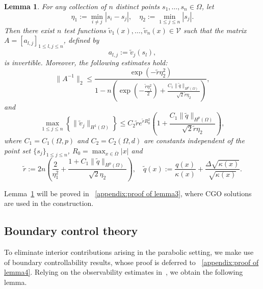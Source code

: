\documentclass[12pt]{amsart}
\newtheorem{lem}[thm]{Lemma}
\begin{document}
\begin{lem}\label{invertible matrix thm}
      For any collection of \( n \) distinct points \( s_1, \ldots, s_n \in \Omega \), let
\[
\eta_1 := \min_{i \neq j} |s_i - s_j|, \quad \eta_2 := \min_{1 \leq j \leq n} |s_j|.
\]
Then there exist \( n \) test functions \( \tilde{v}_1(x), \ldots, \tilde{v}_n(x) \in \mathcal{V} \) such that the matrix \( A = [a_{l,j}]_{1 \leq l,j \leq n} \), defined by
\begin{equation} \label{matrix A}
    a_{l,j} := \tilde{v}_j(s_l),
\end{equation}
is invertible. Moreover, the following estimates hold:
\begin{equation} \label{bound of A}
    \|A^{-1}\|_2 \leq \frac{\exp(-\tilde{r}\eta_2^2)}{1 - n\left( \exp\left(-\frac{\tilde{r} \eta_1^2}{2}\right) + \frac{C_1 \|\tilde{q}\|_{H^p(\Omega)}}{\sqrt{2} \tilde{r} \eta_2} \right)},
\end{equation}
and
\begin{equation} \label{bound of patial v}
    \max_{1 \leq j \leq n} \left\{ \|\tilde{v}_j\|_{H^1(\Omega)} \right\} \leq C_2 \tilde{r} e^{\tilde{r} R_0^2} \left( 1 + \frac{C_1 \|\tilde{q}\|_{H^p(\Omega)}}{\sqrt{2} \tilde{r} \eta_2} \right),
\end{equation}
where \( C_1 = C_1(\Omega, p) \) and \( C_2 = C_2(\Omega, d) \) are constants independent of the point set \( \{s_j\}_{1 \leq j \leq n} \), $R_0=\max_{x\in \overline{\Omega}}|x|$ and
\[
\tilde{r} := 2n \left( \frac{2}{\eta_1^2} + \frac{1 + C_1 \|\tilde{q}\|_{H^p(\Omega)}}{\sqrt{2} \eta_2} \right), \quad \tilde{q}(x) := \frac{q(x)}{\kappa(x)} + \frac{\Delta \sqrt{\kappa(x)}}{\sqrt{\kappa(x)}}.
\]
\end{lem}

Lemma~\ref{invertible matrix thm} will be proved in ~\ref{appendix:proof of lemma3}, where CGO solutions are used in the construction.


\subsection{Boundary control theory}

To eliminate interior contributions arising in the parabolic setting, we make use of boundary controllability results, whose proof is deferred to ~\ref{appendix:proof of lemma4}. Relying on the observability estimates in~\cite{fursikov_controllability_1996}, we obtain the following lemma.
\end{document}

